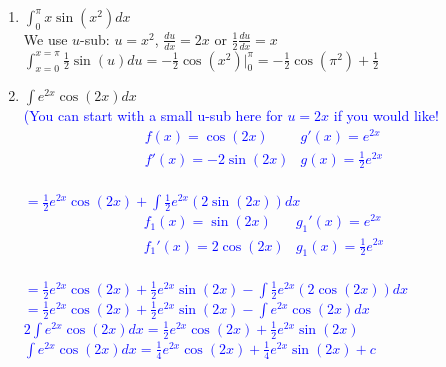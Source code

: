 \documentclass{ximera}
\begin{document}
\begin{exercise}
\begin{enumerate}
        \item $\displaystyle \int_0^\pi x\sin(x^2)dx$\\
        {\color{blue} We use $u$-sub: $u=x^2$, $\frac{du}{dx}=2x$ or $\frac{1}{2}\frac{du}{dx}=x$\\
        $\displaystyle\int_{x=0}^{x=\pi}\frac12\sin(u)du=-\frac12\cos(x^2)\bigg|_0^{\pi}=-\frac12\cos(\pi^2)+\frac12$}
        
        \item $\displaystyle \int e^{2x}\cos(2x)dx$\\
        \textcolor{blue}{(You can start with a small u-sub here for $u=2x$ if you would like!\\
        \[\begin{array}{c|c}
            f(x)=\cos(2x) & g'(x)=e^{2x} \\ \hline
            f'(x)=-2\sin(2x) & g(x)=\frac12e^{2x}
        \end{array}\]\\
        $=\frac12e^{2x}\cos(2x)+\displaystyle\int\frac12e^{2x}(2\sin(2x))dx$\\
        \[\begin{array}{c|c}
            f_1(x)=\sin(2x) & g_1'(x)=e^{2x} \\ \hline
            f_1'(x)=2\cos(2x) & g_1(x)=\frac12e^{2x}
        \end{array}\]\\
        $=\frac12e^{2x}\cos(2x)+\frac12e^{2x}\sin(2x)-\displaystyle\int\frac12e^{2x}(2\cos(2x))dx$\\
        $=\frac12e^{2x}\cos(2x)+\frac12e^{2x}\sin(2x)-\displaystyle\int e^{2x}\cos(2x)dx$\\
        $2\displaystyle\int e^{2x}\cos(2x)dx=\frac12e^{2x}\cos(2x)+\frac12e^{2x}\sin(2x)$\\
         $\displaystyle\int e^{2x}\cos(2x)dx=\frac14e^{2x}\cos(2x)+\frac14e^{2x}\sin(2x)+c$\\}
        
    \end{enumerate}
\end{exercise}
\end{document}
